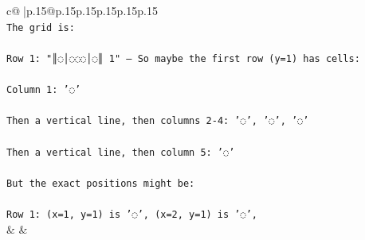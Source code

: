 \documentclass{article}
\begin{document}
{\begin{supertabular}{c@{$\;$}|p{.15\linewidth}@{}p{.15\linewidth}p{.15\linewidth}p{.15\linewidth}p{.15\linewidth}p{.15\linewidth}}
{{{\\ 
\texttt{The grid is:} \\
\\ 
\texttt{Row 1: "║◌│◌◌◌│◌║ 1" – So maybe the first row (y=1) has cells:} \\
\\ 
\texttt{Column 1: '◌'} \\
\\ 
\texttt{Then a vertical line, then columns 2{-}4: '◌', '◌', '◌'} \\
\\ 
\texttt{Then a vertical line, then column 5: '◌'} \\
\\ 
\texttt{But the exact positions might be:} \\
\\ 
\texttt{Row 1: (x=1, y=1) is '◌', (x=2, y=1) is '◌',} \\
            }
        }
    }
    & & \\ \\


\end{supertabular}}
\end{document}
